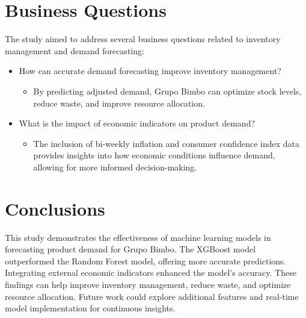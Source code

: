 \documentclass{article}
\begin{document}
\section{Business Questions}
The study aimed to address several business questions related to inventory management and demand forecasting:
\begin{itemize}
    \item How can accurate demand forecasting improve inventory management?
    \begin{itemize}
        \item By predicting adjusted demand, Grupo Bimbo can optimize stock levels, reduce waste, and improve resource allocation.
    \end{itemize}
    \item What is the impact of economic indicators on product demand?
    \begin{itemize}
        \item The inclusion of bi-weekly inflation and consumer confidence index data provides insights into how economic conditions influence demand, allowing for more informed decision-making.
    \end{itemize}
\end{itemize}

\section{Conclusions}
This study demonstrates the effectiveness of machine learning models in forecasting product demand for Grupo Bimbo. The XGBoost model outperformed the Random Forest model, offering more accurate predictions. Integrating external economic indicators enhanced the model's accuracy. These findings can help improve inventory management, reduce waste, and optimize resource allocation. Future work could explore additional features and real-time model implementation for continuous insights.
\end{document}
